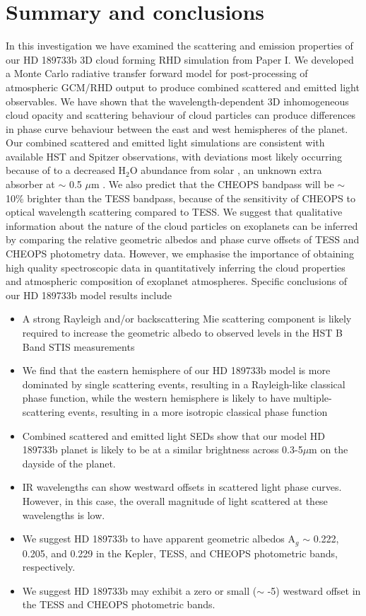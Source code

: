 \documentclass{aa}
\begin{document}
\section{Summary and conclusions}
\label{sec:Conclusions}

In this investigation we have examined the scattering and emission properties of our HD 189733b 3D cloud forming RHD simulation from Paper I.
We developed a Monte Carlo radiative transfer forward model for post-processing of atmospheric GCM/RHD output to produce combined scattered and emitted light observables.
We have shown that the wavelength-dependent 3D inhomogeneous cloud opacity and scattering behaviour of cloud particles can produce differences in phase curve behaviour between the east and west hemispheres of the planet.
Our combined scattered and emitted light simulations are consistent with available HST and Spitzer observations, with deviations most likely occurring because of to a decreased H$_{2}$O abundance from solar \citep[e.g.][]{Crouzet2014}, an unknown extra absorber at $\sim$ 0.5 $\mu$m \citep{Evans2013, Barstow2014}.
We also predict that the CHEOPS bandpass will be $\sim$ 10\% brighter than the TESS bandpass, because of the sensitivity of CHEOPS to optical wavelength scattering compared to TESS.
We suggest that qualitative information about the nature of the cloud particles on exoplanets can be inferred by comparing the relative geometric albedos and phase curve offsets of TESS and CHEOPS photometry data.
However, we emphasise the importance of obtaining high quality spectroscopic data in quantitatively inferring the cloud properties and atmospheric composition of exoplanet atmospheres.
Specific conclusions of our HD 189733b model results include

\begin{itemize}
\item A strong Rayleigh and/or backscattering Mie scattering component is likely required to increase the geometric albedo to observed levels in the HST B Band STIS measurements
\item We find that the eastern hemisphere of our HD 189733b model is more dominated by single scattering events, resulting in a Rayleigh-like classical phase function, while the western hemisphere is likely to have multiple-scattering events, resulting in a more isotropic classical phase function
\item Combined scattered and emitted light SEDs show that our model HD 189733b planet is likely to be at a similar brightness across 0.3-5$\mu$m on the dayside of the planet.
\item IR wavelengths can show westward offsets in scattered light phase curves. However, in this case, the overall magnitude of light scattered at these wavelengths is low.
\item We suggest HD 189733b to have apparent geometric albedos A$_{g}$ $\sim$ 0.222, 0.205, and 0.229 in the Kepler, TESS, and CHEOPS photometric bands, respectively.
\item We suggest HD 189733b may exhibit a zero or small ($\sim$ -5\degr) westward offset in the TESS and CHEOPS photometric bands.
\end{itemize}
\end{document}
